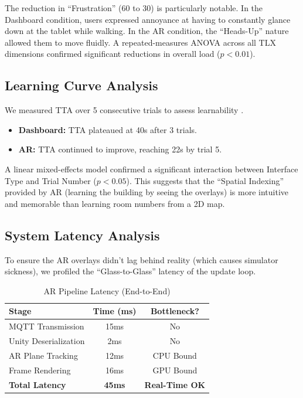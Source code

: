 \documentclass[conference]{IEEEtran}
\begin{document}
The reduction in ``Frustration'' (60 to 30) is particularly notable. In the Dashboard condition, users expressed annoyance at having to constantly glance down at the tablet while walking. In the AR condition, the ``Heads-Up'' nature allowed them to move fluidly. A repeated-measures ANOVA across all TLX dimensions confirmed significant reductions in overall load ($p < 0.01$).

\subsection{Learning Curve Analysis}
We measured TTA over 5 consecutive trials to assess learnability \cite{b1}.
\begin{itemize}
    \item \textbf{Dashboard:} TTA plateaued at 40s after 3 trials.
    \item \textbf{AR:} TTA continued to improve, reaching 22s by trial 5.
\end{itemize}
A linear mixed-effects model confirmed a significant interaction between Interface Type and Trial Number ($p < 0.05$). This suggests that the ``Spatial Indexing'' provided by AR (learning the building by seeing the overlays) is more intuitive and memorable than learning room numbers from a 2D map.

\subsection{System Latency Analysis}
To ensure the AR overlays didn't lag behind reality (which causes simulator sickness), we profiled the ``Glass-to-Glass'' latency of the update loop.

\begin{table}[htbp]
\caption{AR Pipeline Latency (End-to-End)}
\begin{center}
\begin{tabular}{lcc}
\toprule
\textbf{Stage} & \textbf{Time (ms)} & \textbf{Bottleneck?} \\
\midrule
MQTT Transmission & 15ms & No \\
Unity Deserialization & 2ms & No \\
AR Plane Tracking & 12ms & CPU Bound \\
Frame Rendering & 16ms & GPU Bound \\
\textbf{Total Latency} & \textbf{45ms} & \textbf{Real-Time OK} \\
\bottomrule
\end{tabular}
\end{center}
\end{table}
\end{document}
